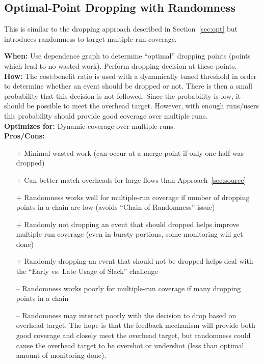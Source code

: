 \documentclass[11pt, letterpaper]{article}
\begin{document}
\subsection{Optimal-Point Dropping with Randomness}
\label{sec:opt_rand}
This is similar to the dropping approach described in Section~\ref{sec:opt} but
introduces randomness to target multiple-run coverage.

\noindent\textbf{When: } Use dependence graph to determine ``optimal'' dropping points
(points which lead to no wasted work). Perform dropping decision at these
points. \\
\textbf{How: } The cost:benefit ratio is used with a dynamically tuned threshold
in order to determine whether an event should be dropped or not. There is then
a small probability that this decision is not followed. Since the probability
is low, it should be possible to meet the overhead target. However, with enough
runs/users this probability should provide good coverage over multiple runs. \\
\textbf{Optimizes for: } Dynamic coverage over multiple runs. \\
\textbf{Pros/Cons: }
\begin{itemize}
  \item[+] Minimal wasted work (can occur at a merge point if only one half was dropped)
  \item[+] Can better match overheads for large flows than Approach~\ref{sec:source}
  \item[+] Randomness works well for multiple-run coverage if number of dropping points in a chain are low (avoids ``Chain of Randomness'' issue)
  \item[+] Randomly not dropping an event that should dropped helps improve multiple-run coverage (even in bursty portions, some monitoring will get done)
  \item[+] Randomly dropping an event that should not be dropped helps deal with the ``Early vs. Late Usage of Slack'' challenge
  \item[--] Randomness works poorly for multiple-run coverage if many dropping points in a chain
  \item[--] Randomness may interact poorly with the decision to drop based on
  overhead target. The hope is that the feedback mechanism will provide both good
  coverage and closely meet the overhead target, but randomness could cause the
  overhead target to be overshot or undershot (less than optimal amount of monitoring done).
\end{itemize}
\end{document}
